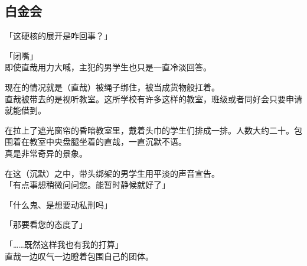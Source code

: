 \subsection{白金会}

「这硬核的展开是咋回事？」

「闭嘴」\\

即使直哉用力大喊，主犯的男学生也只是一直冷淡回答。

现在的情况就是（直哉）被绳子绑住，被当成货物般扛着。\\

直哉被带去的是视听教室。这所学校有许多这样的教室，班级或者同好会只要申请就能借到。

在拉上了遮光窗帘的昏暗教室里，戴着头巾的学生们排成一排。人数大约二十。包围着在教室中央盘腿坐着的直哉，一直沉默不语。\\

真是非常奇异的景象。

在这（沉默）之中，带头绑架的男学生用平淡的声音宣告。\\

「有点事想稍微问问您。能暂时静候就好了」

「什么鬼、是想要动私刑吗」

「那要看您的态度了」

「……既然这样我也有我的打算」\\

直哉一边叹气一边瞪着包围自己的团体。\\

